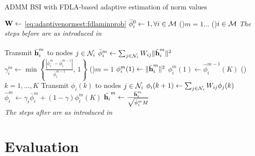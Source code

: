\documentclass{article}
\begin{document}
\begin{algorithm}[t]
    \caption{ADMM BSI with FDLA-based adaptive estimation of norm values}\label{alg:davg_norm_est}
    \(\bm{\mathrm{W}} \gets\) \eqref{eq:adaptivenormest:fdlaminprob}\;
    \(\bar{\phi}_i^{0} \gets 1, \forall i \in \mathcal{M}\)\;
    \For(){\(m=1\dots\)}
    {
        \For(){\(i \in \mathcal{M}\)}
        {
            \emph{The steps before are as introduced in }\cite{blochbergerDBSI}\\
            \dotfill\\
            Transmit \(\bar{\bm{\mathrm{h}}}_i^{m}\) to nodes  \(j \in \mathcal{N}_i\)\;
            \(\bar{\phi}_i^{m} \gets \sum_{j \in \mathcal{N}_i} W_{ij} \|\bar{\bm{\mathrm{h}}}_i^m\|^2\)\;
            \(\gamma_i^{m} \gets \min \left\lbrace \frac{| \bar{\phi}_i^{m} - \bar{\phi}_i^{m-1} |}{\bar{\phi}_i^{m-1}},\,1\right\rbrace\)\;
            \eIf(){\(m = 1\)}
            {
                \(\phi_i^{m}(1) \gets \|\bar{\bm{\mathrm{h}}}_i^m\|^2\)\;
            }
            {
                \(\phi_i^{m}(1) \gets \hat{\phi}_i^{m-1}(K)\)\;
            }
            \For(){\(k=1,\dots,K\)}
            {
                Transmit \(\phi_i(k)\) to nodes  \(j \in \mathcal{N}_i\)\;
                \(\phi_i({k+1}) \gets \sum_{j \in \mathcal{N}_i} W_{ij} \phi_j({k})\)\;
            }
            \(\hat{\phi}_i^{m} \gets \gamma_i \bar{\phi}_i^{m} + (1-\gamma) \phi_i^{m}(K)\)\;
            \(\hat{\bm{\mathrm{h}}_i}^{m} \gets \frac{\bar{\bm{\mathrm{h}}}_i^{m}}{\sqrt{\hat{\phi}_i^{m}M}}\)\;
            \dotfill\\
            \emph{The steps after are as introduced in }\cite{blochbergerDBSI}\\
        }
    }
\end{algorithm}



\section{Evaluation}
\label{sec:simulations}
\end{document}
